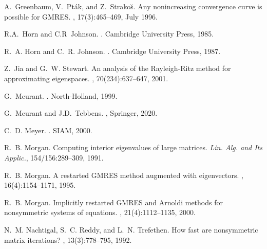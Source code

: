\documentclass{report}
\begin{document}
\begin{thebibliography}{100}
	
	 A.~Greenbaum, V.~Pták, and Z.~Strako{\u{s}}. \newblock Any nonincreasing
	convergence curve is possible for {GMRES}. ,
	17(3):465--469, July 1996.
	

	

	
	 R.A.~Horn and C.R~Johnson. . \newblock
	Cambridge University Press, 1985.
  
  
	

		
	 R.~A. Horn and C.~R. Johnson. . \newblock Cambridge
	University Press, 1987.
	


	
	 Z.~Jia and G.~W. Stewart. \newblock An analysis of the {Rayleigh-Ritz} method for
	approximating
	eigenspaces.
	, 70(234):637--647, 2001.
	
	 G.~Meurant. . \newblock
    North-Holland, 1999.

      G.~Meurant and J.D.~Tebbens.
    , Springer, 2020.
	

	

	
	 C.~D. Meyer. . \newblock SIAM,
	2000.
	
 R.~B. Morgan. \newblock Computing interior eigenvalues of large matrices. \newblock
{\em Lin. Alg. and Its Applic.}, 154/156:289--309, 1991.

 R.~B. Morgan. \newblock A restarted {GMRES} method augmented with eigenvectors.
    ,
  16(4):1154--1171, 1995.


 R.~B. Morgan. \newblock Implicitly restarted {GMRES} and {Arnoldi} methods for
nonsymmetric
systems of equations.
,
21(4):1112--1135, 2000.
	
 N.~M. Nachtigal, S.~C. Reddy, and L.~N. Trefethen. \newblock How fast are
    nonsymmetric matrix iterations? ,
  13(3):778--795, 1992.


\end{thebibliography}
\end{document}
